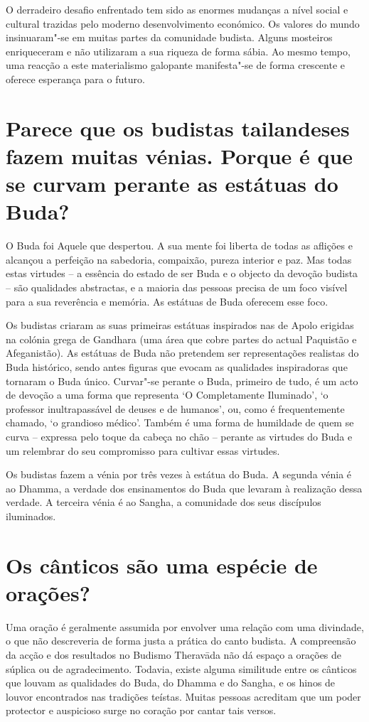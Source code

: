 O derradeiro desafio enfrentado tem sido as enormes mudanças a nível
social e cultural trazidas pelo moderno desenvolvimento económico. Os
valores do mundo insinuaram"-se em muitas partes da comunidade budista.
Alguns mosteiros enriqueceram e não utilizaram a sua riqueza de forma
sábia. Ao mesmo tempo, uma reacção a este materialismo galopante
manifesta"-se de forma crescente e oferece esperança para o futuro.

\section{Parece que os budistas tailandeses fazem muitas vénias. Porque é que se
  curvam perante as estátuas do Buda?}

O Buda foi Aquele que despertou. A sua mente foi liberta de todas as
aflições e alcançou a perfeição na sabedoria, compaixão, pureza interior
e paz. Mas todas estas virtudes -- a essência do estado de ser Buda e o
objecto da devoção budista -- são qualidades abstractas, e a maioria das
pessoas precisa de um foco visível para a sua reverência e memória. As
estátuas de Buda oferecem esse foco.

Os budistas criaram as suas primeiras estátuas inspirados nas de Apolo
erigidas na colónia grega de Gandhara (uma área que cobre partes do
actual Paquistão e Afeganistão). As estátuas de Buda não pretendem ser
representações realistas do Buda histórico, sendo antes figuras que
evocam as qualidades inspiradoras que tornaram o Buda único. Curvar"-se
perante o Buda, primeiro de tudo, é um acto de devoção a uma forma que
representa `O Completamente Iluminado', `o professor inultrapassável
de deuses e de humanos', ou, como é frequentemente chamado, `o
grandioso médico'. Também é uma forma de humildade de quem se curva --
expressa pelo toque da cabeça no chão -- perante as virtudes do Buda e
um relembrar do seu compromisso para cultivar essas virtudes.

Os budistas fazem a vénia por três vezes à estátua do Buda. A segunda
vénia é ao Dhamma, a verdade dos ensinamentos do Buda que levaram à
realização dessa verdade. A terceira vénia é ao Sangha, a comunidade dos
seus discípulos iluminados.

\section{Os cânticos são uma espécie de orações?}

Uma oração é geralmente assumida por envolver uma relação com uma
divindade, o que não descreveria de forma justa a prática do canto
budista. A compreensão da acção e dos resultados no Budismo Theravāda
não dá espaço a orações de súplica ou de agradecimento. Todavia, existe
alguma similitude entre os cânticos que louvam as qualidades do Buda, do
Dhamma e do Sangha, e os hinos de louvor encontrados nas tradições
teístas. Muitas pessoas acreditam que um poder protector e auspicioso
surge no coração por cantar tais versos.

